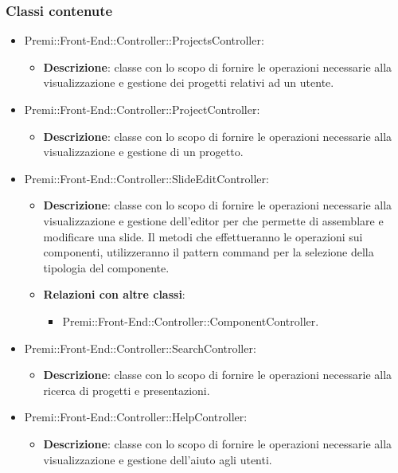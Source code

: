 	\subsubsection*{Classi contenute}
		\begin{itemize}
		 \item Premi::Front-End::Controller::ProjectsController:
			\begin{itemize}
				\item \textbf{Descrizione}: classe con lo scopo di fornire le operazioni necessarie alla visualizzazione e gestione dei progetti relativi ad un utente.
			\end{itemize}
		\item  Premi::Front-End::Controller::ProjectController: 
			 \begin{itemize}
				\item \textbf{Descrizione}: classe con lo scopo di fornire le operazioni necessarie alla visualizzazione e gestione di un progetto.
			\end{itemize}
		\item  Premi::Front-End::Controller::SlideEditController: 
			 \begin{itemize}
				\item \textbf{Descrizione}: classe con lo scopo di fornire le operazioni necessarie alla visualizzazione e gestione dell'editor per che permette di assemblare e modificare una \gls{slide}. Il metodi che effettueranno le operazioni sui componenti, utilizzeranno il pattern command per la selezione della tipologia del componente.
				\item \textbf{Relazioni con altre classi}:
				\begin{itemize}
					\item Premi::Front-End::Controller::ComponentController.
				\end{itemize}
			\end{itemize}
		\item  Premi::Front-End::Controller::SearchController: 
			 \begin{itemize}
				\item \textbf{Descrizione}: classe con lo scopo di fornire le operazioni necessarie alla ricerca di progetti e presentazioni.
			\end{itemize}
		\item  Premi::Front-End::Controller::HelpController: 
			 \begin{itemize}
				\item \textbf{Descrizione}: classe con lo scopo di fornire le operazioni necessarie alla visualizzazione e gestione dell'aiuto agli utenti.

\end{itemize}
\end{itemize}
